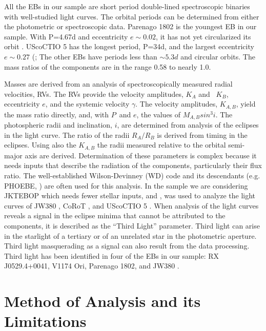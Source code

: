 \documentclass[12pt,preprint]{aastex6}
\begin{document}
All the EBs in our sample are short period double-lined 
spectroscopic binaries with well-studied light curves.
The orbital periods can be determined from either the 
photometric or spectroscopic data.  Parenago 1802 is 
the youngest EB in our 
sample.  With P=4.67d and eccentricity $e \sim0.02$, it has 
not yet circularized its orbit \citep{2012ApJ...745...58G}. 
UScoCTIO 5 has the longest period, P=34d,
and the largest eccentricity $e \sim 0.27$ 
(\citet {2015ApJ...807....3K}; \citet{2016ApJ...816...21D} 
The other EBs have periods 
less than $\sim 5.3d$ and circular orbits.  The mass
ratios of the components are in the range 0.58 to nearly
1.0.

Masses are derived from 
an analysis of spectroscopically measured radial 
velocities, RVs.  The RVs provide the velocity amplitudes, 
$K_A$ and ~$K_B$, eccentricity $e$, and the systemic 
velocity $\gamma$.  The velocity amplitudes, 
$K_{A,B}$, yield  the mass ratio directly, and, with
$P$~and $e$, the values of $M_{A,B}sin^3 i$.  
The  photospheric radii and inclination, $i$, 
are determined from analysis of the eclipses in 
the light curve. The ratio of the radii $R_A/R_B$ 
is derived from timing in the eclipses. Using 
also the $K_{A,B}$ the radii measured relative to 
the orbital semi-major axis are derived. 
Determination of these parameters is complex because 
it needs inputs that describe the radiation 
of the components, particularly their flux ratio.
The well-established Wilson-Devinney (WD) code 
\citep{1971ApJ...166..605W} and its descendants 
(e.g. PHOEBE, \citet{2005ApJ...628..426P}) are often 
used for this analysis. In the sample we are considering
JKTEBOP which needs fewer stellar inputs,
\citep{2007A&A...467.1215S} and \citep{1981AJ.....86..102P},
was used to analyze the light curves of JW380 \citep{2007MNRAS.380.541I},
CoRoT \citep{2014A&A...562A..50G},
and UScoCTIO 5 \citep{2016ApJ...816...21D}.
When analysis of the light curves reveals 
a signal in the eclipse minima that cannot be attributed
to the components, it is described as the ``Third Light''
parameter. Third light can arise in the starlight of a tertiary 
or of an unrelated star in the photometric aperture.  Third light
masquerading as a  signal can also result from the data processing.
Third light has been identified in four of the EBs in our 
sample: RX J0529.4+0041, V1174 Ori, Parenago 1802, and 
JW380 \citep{2014NewAR..60....1S}.


\section{Method of Analysis and its Limitations}
 
\end{document}
